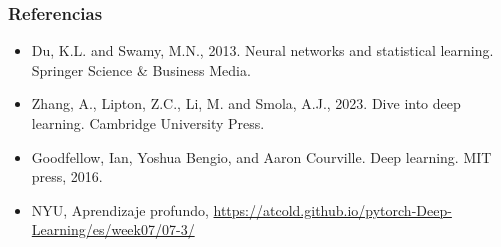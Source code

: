 \documentclass[aspectratio=169]{beamer}
\begin{document}
	
	\begin{frame}
		\frametitle{Referencias}
		\begin{itemize}
			\item Du, K.L. and Swamy, M.N., 2013. Neural networks and statistical learning. Springer Science \& Business Media.
			\item Zhang, A., Lipton, Z.C., Li, M. and Smola, A.J., 2023. Dive into deep learning. Cambridge University Press.
			\item Goodfellow, Ian, Yoshua Bengio, and Aaron Courville. Deep learning. MIT press, 2016.
			\item NYU, Aprendizaje profundo, \url{https://atcold.github.io/pytorch-Deep-Learning/es/week07/07-3/}
		\end{itemize}
	\end{frame}
	
	
\end{document}
